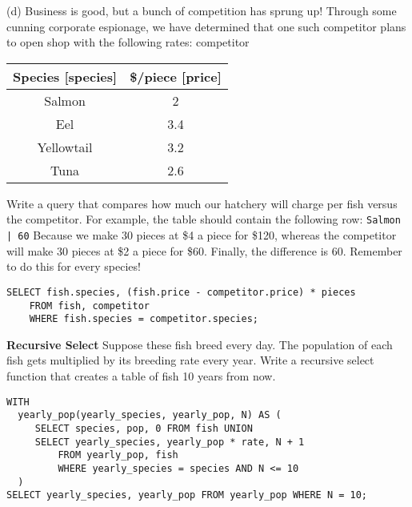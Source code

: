 \documentclass{exam}
\begin{document}
\begin{questions}
\begin{blocksection} 
(d) Business is good, but a bunch of competition has sprung up! Through some cunning corporate espionage, we have determined that one such competitor plans to open shop with the following rates:\newline
\newline
competitor
\begin{center}
\begin{tabular}{ |c|c| } 
 \hline
 Species [species] & \$/piece [price] \\ 
 \hline
 Salmon & 2 \\ 
 \hline
 Eel & 3.4 \\ 
 \hline
  Yellowtail & 3.2  \\ 
 \hline
 Tuna & 2.6  \\ 
 \hline
\end{tabular}
\end{center}
Write a query that compares how much our hatchery will charge per fish versus the competitor. For example, the table should contain the following row: \newline
\texttt{Salmon | 60} \newline \newline
Because we make 30 pieces at \$4 a piece for \$120, whereas the competitor will make 30 pieces at \$2 a piece for \$60. Finally, the difference is 60. Remember to do this for every species!
\begin{solution}[1in]
\begin{lstlisting}
SELECT fish.species, (fish.price - competitor.price) * pieces 
    FROM fish, competitor 
    WHERE fish.species = competitor.species;
\end{lstlisting}
\end{solution}


\end{blocksection}

\question \textbf{Recursive Select} Suppose these fish breed every day. The population of each fish gets multiplied by its breeding rate every year. Write a recursive select function that creates a table of fish 10 years from now.

\begin{solution}[0.5in]
\begin{lstlisting}
WITH 
  yearly_pop(yearly_species, yearly_pop, N) AS (
     SELECT species, pop, 0 FROM fish UNION
     SELECT yearly_species, yearly_pop * rate, N + 1 
         FROM yearly_pop, fish 
         WHERE yearly_species = species AND N <= 10
  )
SELECT yearly_species, yearly_pop FROM yearly_pop WHERE N = 10;

\end{lstlisting}
\end{solution}


\end{questions}

\end{document}
